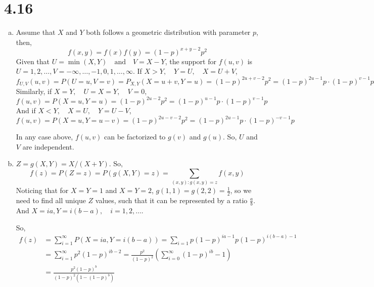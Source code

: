 \documentclass[letterpaper]{article}
\begin{document}
    \section*{4.16}
    	\begin{enumerate}[(a)]
    	\item Assume that $X$ and $Y$ both follows a geometric distribution with parameter $p$, then,
    	\[
    	f(x, y) = f(x) f(y) = (1-p)^{x+y-2} p^2
    	\]
    	Given that $U = \min(X, Y) \quad \text{and} \quad V = X-Y$,
    	the support for $f(u, v)$ is $U=1, 2, \dots, V = -\infty, \dots, -1, 0, 1, \dots, \infty$.
    	If $X > Y, \quad Y = U, \quad X = U+V$,
    	\[
    	f_{U,V}(u, v) = P(U=u, V=v) = P_{X, Y}(X=u+v, Y=u) = (1-p)^{2u+v-2}p^2 = (1-p)^{2u-1}p \cdot (1-p)^{v-1}p
    	\]
    	Similarly, if $X = Y, \quad U = X = Y, \quad V = 0$,
    	\[
    	f(u, v) = P(X=u, Y=u) = (1-p)^{2u-2} p^2 = (1-p)^{u-1}p \cdot (1-p)^{v-1}p
    	\]
    	And if $X < Y, \quad X = U, \quad Y = U-V$,
    	\[
    	f(u, v) = P(X=u, Y = u-v) = (1-p)^{2u-v-2}p^2 = (1-p)^{2u-1}p \cdot (1-p)^{-v-1}p
    	\] 
    	
    	In any case above, $f(u,v)$ can be factorized to $g(v)$ and $g(u)$. So, $U$ and $V$ are independent.
    	\item $Z = g(X, Y) = X/(X+Y)$. So,
        \[
        f(z) = P(Z=z) = P(g(X,Y) = z) = \sum_{(x,y): g(x, y)=z} f(x, y)
        \]
        Noticing that for $X=Y=1$ and $X=Y=2$, $g(1,1) = g(2,2) = \frac{1}{2}$, so we need to find all unique $Z$ values, such that it can be represented by a ratio $\frac{a}{b}$. And $X = ia, Y = i(b-a), \quad i = 1, 2, \dots$.

        So,
        \begin{align*}
        f(z) & = \sum_{i=1}^\infty P(X=ia, Y=i(b-a)) = \sum_{i=1} p(1-p)^{ia-1}p(1-p)^{i(b-a)-1} \\
        & = \sum_{i=1}^\infty p^2(1-p)^{ib-2} = \frac{p^2}{(1-p)^2} (\sum_{i=0}^\infty (1-p)^{ib} - 1) \\
        & = \frac{p^2(1-p)^b}{(1-p)^2\left(1-(1-p)^b\right)}
        \end{align*}
    	\end{enumerate}
\end{document}

